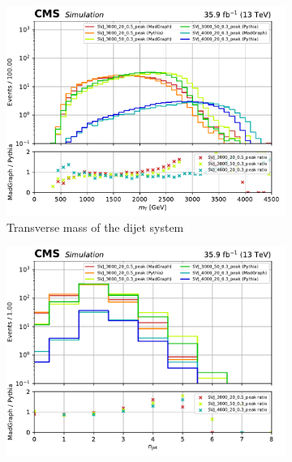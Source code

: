 \begin{figure}[htbp]
    \centering
    \begin{subfigure}[b]{0.48\textwidth}
        \includegraphics[width=\textwidth]{figures/madgraph_pythia_comparisons/with_ratios/part2/dijet_mt.pdf}
        \caption{Transverse mass of the dijet system}
    \end{subfigure}
    \hfill
    \begin{subfigure}[b]{0.48\textwidth}
        \includegraphics[width=\textwidth]{figures/madgraph_pythia_comparisons/with_ratios/part2/njet.pdf}
        \caption{\njet}
    \end{subfigure}


\end{figure}
